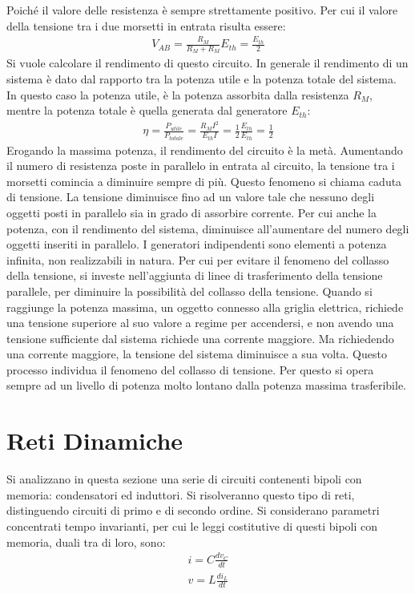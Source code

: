 \documentclass{article}
\numberwithin{equation}{subsection}
\begin{document}
Poiché il valore delle resistenza è sempre strettamente positivo. Per cui il valore della tensione tra i due morsetti in entrata risulta essere:
\begin{gather*}
    V_{AB}=\displaystyle\frac{R_M}{R_M+R_M}E_{th}=\frac{E_{th}}{2}
\end{gather*}
Si vuole calcolare il rendimento di questo circuito. In generale il rendimento di un sistema è dato dal rapporto tra la potenza utile e la potenza totale del sistema. In questo 
caso la potenza utile, è la potenza assorbita dalla resistenza $R_M$, mentre la potenza totale è quella generata dal generatore $E_{th}$:
\begin{gather*}
    \eta=\displaystyle\frac{P_{utile}}{P_{totale}}=\frac{R_{M}I^2}{E_{th}I}=\frac{1}{2}\frac{E_{th}}{E_{th}}=\frac{1}{2}
\end{gather*}
Erogando la massima potenza, il rendimento del circuito è la metà. Aumentando il numero di resistenza poste in parallelo in entrata al circuito, la tensione tra i morsetti 
comincia a diminuire sempre di più. Questo fenomeno si chiama caduta di tensione. La tensione diminuisce fino ad un valore tale che nessuno degli oggetti posti in parallelo 
sia in grado di assorbire corrente. Per cui anche la potenza, con il rendimento del sistema, diminuisce all'aumentare del numero degli oggetti inseriti in parallelo. I 
generatori indipendenti sono elementi a potenza infinita, non realizzabili in natura. Per cui per evitare il fenomeno del collasso della tensione, si investe nell'aggiunta di 
linee di trasferimento della tensione parallele, per diminuire la possibilità del collasso della tensione. Quando si raggiunge la potenza massima, un oggetto connesso alla 
griglia elettrica, richiede una tensione superiore al suo valore a regime per accendersi, e non avendo una tensione sufficiente dal sistema richiede una corrente maggiore. 
Ma richiedendo una corrente maggiore, la tensione del sistema diminuisce a sua volta. Questo processo individua il fenomeno del collasso di tensione. Per questo si opera 
sempre ad un livello di potenza molto lontano dalla potenza massima trasferibile. 

\clearpage 

\section{Reti Dinamiche}

Si analizzano in questa sezione una serie di circuiti contenenti bipoli con memoria: condensatori ed induttori. Si risolveranno questo tipo di reti, distinguendo 
circuiti di primo e di secondo ordine. Si considerano parametri concentrati tempo invarianti, per cui le leggi costitutive di questi bipoli con memoria, duali tra di loro, sono:
\begin{gather*}
    i=\displaystyle C\frac{dv_C}{dt}\\
    v=\displaystyle L\frac{di_L}{dt}
\end{gather*}
\end{document}
